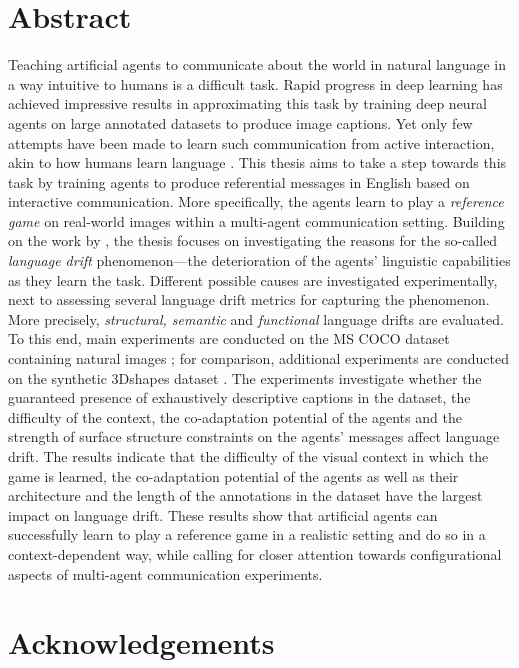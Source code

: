 \documentclass[11pt, twoside, openright]{report} %
\begin{document}


\chapter*{Abstract}
Teaching artificial agents to communicate about the world in natural language in a way intuitive to humans is a difficult task. Rapid progress in deep learning has achieved impressive results in approximating this task by training deep neural agents on large annotated datasets to produce image captions. Yet only few attempts have been made to learn such communication from active interaction, akin to how humans learn language \parencite[e.g.,][]{clark1996using}.
This thesis aims to take a step towards this task by training agents to produce referential messages in English based on interactive communication. More specifically, the agents learn to play a \emph{reference game} on real-world images within a multi-agent communication setting. Building on the work by \cite{lazaridou2020multi}, the thesis focuses on investigating the reasons for the so-called \emph{language drift} phenomenon---the deterioration of the agents' linguistic capabilities as they learn the task. Different possible causes are investigated experimentally, next to assessing several language drift metrics for capturing the phenomenon. More precisely, \emph{structural, semantic} and \emph{functional} language drifts are evaluated.
To this end, main experiments are conducted on the MS COCO dataset containing natural images \parencite{chen2015microsoft}; for comparison, additional experiments are conducted on the synthetic 3Dshapes dataset \parencite{burgess20183d}.
The experiments investigate whether the guaranteed presence of exhaustively descriptive captions in the dataset, the difficulty of the context, the co-adaptation potential of the agents and the strength of surface structure constraints on the agents' messages affect language drift. The results indicate that the difficulty of the visual context in which the game is learned, the co-adaptation potential of the agents as well as their architecture and the length of the annotations in the dataset have the largest impact on language drift. These results show that artificial agents can successfully learn to play a reference game in a realistic setting and do so in a context-dependent way, while calling for closer attention towards configurational aspects of multi-agent communication experiments.  


\chapter*{Acknowledgements}
\end{document}
